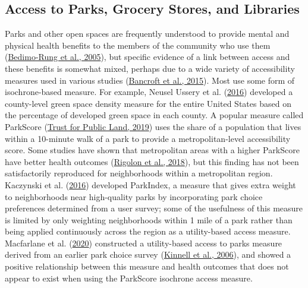 \documentclass[review, 3p]{elsarticle} %
\begin{document}
\hypertarget{access-to-parks-grocery-stores-and-libraries}{%
\subsection{Access to Parks, Grocery Stores, and Libraries}\label{access-to-parks-grocery-stores-and-libraries}}

Parks and other open spaces are frequently understood to provide mental and physical
health benefits to the members of the community who use them (\protect\hyperlink{ref-bedimo2005}{Bedimo-Rung et al., 2005}), but
specific evidence of a link between access and these benefits is somewhat mixed,
perhaps due to a wide variety of accessibility measures used in various studies
(\protect\hyperlink{ref-bancroft2015association}{Bancroft et al., 2015}). Most use some form of isochrone-based measure. For example,
Neusel Ussery et al. (\protect\hyperlink{ref-neusel2016}{2016}) developed a county-level green space density measure for the entire United
States based on the percentage of developed green space in each county.
A popular measure called ParkScore (\protect\hyperlink{ref-parkscore2019}{Trust for Public Land, 2019}) uses the share of a
population that lives within a 10-minute walk of a park to provide a metropolitan-level
accessibility score. Some studies have shown that metropolitan areas with a higher
ParkScore have better health outcomes (\protect\hyperlink{ref-rigolon2018}{Rigolon et al., 2018}), but this finding has not
been satisfactorily reproduced for neighborhoods within a metropolitan region.
Kaczynski et al. (\protect\hyperlink{ref-kacynski2016}{2016}) developed ParkIndex, a
measure that gives extra weight to neighborhoods near high-quality parks by
incorporating park choice preferences determined from a user survey; some of the
usefulness of this measure is limited by only weighting neighborhoods within 1
mile of a park rather than being applied continuously across the region as a utility-based
access measure. Macfarlane et al. (\protect\hyperlink{ref-macfarlane2020}{2020}) constructed a utility-based access to parks
measure derived from an earlier park choice survey (\protect\hyperlink{ref-kinnell2006}{Kinnell et al., 2006}), and showed a
positive relationship between this measure and health outcomes that does not
appear to exist when using the ParkScore isochrone access measure.
\end{document}

